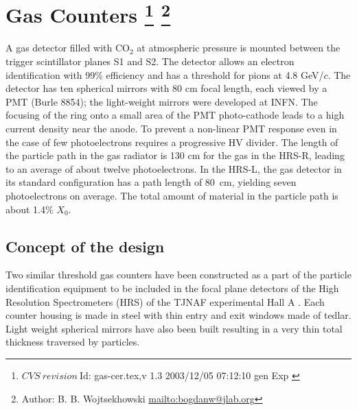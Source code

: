 \chapter[Gas \Cherenkov{} Counters]{Gas \Cherenkov{} Counters
\footnote{
  $CVS~revision~ $Id: gas-cer.tex,v 1.3 2003/12/05 07:12:10 gen Exp $ $
}
\footnote{Author: B. B. Wojtsekhowski \url{mailto:bogdanw@jlab.org}}
}

A gas \Cherenkov{} detector filled  with CO$_{2}$ at atmospheric 
pressure is mounted between the trigger scintillator planes S1 and S2. 
The detector allows an electron identification
with 99\% efficiency and has a threshold for pions at 4.8 GeV/$c$.
The detector has ten spherical mirrors with 80 cm focal length, each
viewed by a PMT (Burle 8854);
the light-weight mirrors were developed at INFN.
The focusing of the \Cherenkov{} ring onto a
small area of the PMT photo-cathode leads to a high current density  near
the anode. To prevent a non-linear PMT response even in the case of few
photoelectrons requires a progressive HV divider.
The length of the particle path in the gas radiator is 130 cm for the gas
\Cherenkov{} in the HRS-R, leading to an average of about twelve photoelectrons.
In the HRS-L, the gas \Cherenkov{} detector in its standard configuration has
a path length of 80~cm, yielding seven photoelectrons on average.
The total amount of material in the particle path is about 1.4\% $X_0$.

\section[Concept of the design]{Concept of the design}

Two similar threshold gas \Cherenkov{} counters have been constructed 
as a part of the particle identification equipment to be included 
in the focal plane detectors of the High Resolution Spectrometers (HRS) 
of the TJNAF experimental Hall A%
. 
Each counter housing is made in steel with thin entry and 
exit windows made of tedlar.
Light weight spherical mirrors have also been built resulting in 
a very thin total thickness traversed by particles. 
%

